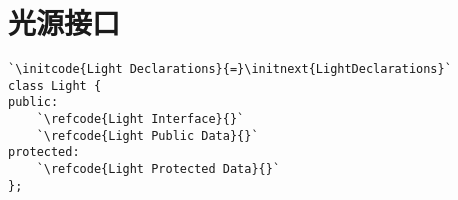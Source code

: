 \section{光源接口}\label{sec:光源接口}

\label{code:overview_Light}
\begin{lstlisting}
`\initcode{Light Declarations}{=}\initnext{LightDeclarations}`
class Light {
public:
    `\refcode{Light Interface}{}`
    `\refcode{Light Public Data}{}`
protected:
    `\refcode{Light Protected Data}{}`
};
\end{lstlisting}